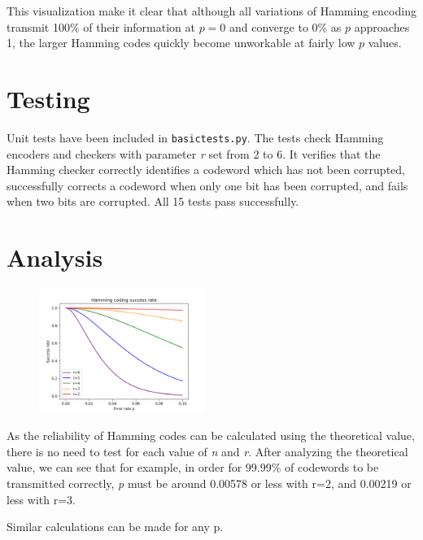 \documentclass[11pt, oneside]{article}   	%
\begin{document}
This visualization make it clear that although all variations of Hamming encoding transmit 100\% of their information at $p=0$ and converge to 0\% as $p$ approaches 1, the larger Hamming codes quickly become unworkable at fairly low $p$ values. 

\section*{Testing}

Unit tests have been included in \verb!basictests.py!. The tests check Hamming encoders and checkers with parameter \textit{r} set from 2 to 6. It verifies that the Hamming checker correctly identifies a codeword which has not been corrupted, successfully corrects a codeword when only one bit has been corrupted, and fails when two bits are corrupted. All 15 tests pass successfully. 

\section*{Analysis}


\begin{figure}
\vspace*{-1.3cm}
\centering
\includegraphics[width=0.48\textwidth]{figure2}
\end{figure}

As the reliability of Hamming codes can be calculated using the theoretical value, there is no need to test for each value of \textit{n} and \textit{r}. After analyzing the theoretical value, we can see that for example, in order for 99.99\% of codewords to be transmitted correctly, \textit{p} must be around 0.00578 or less with r=2, and 0.00219 or less with r=3.

Similar calculations can be made for any p. 
\end{document}
